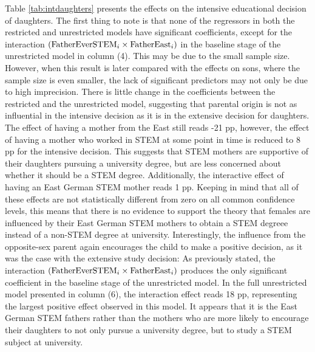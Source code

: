 \documentclass[a4paper, oneside, hyperfootnotes = false]{article}
\begin{document}
{Table \ref{tab:intdaughters} presents the effects on the intensive educational decision of daughters.
The first thing to note is that none of the regressors in both the restricted and unrestricted models have significant coefficients, except for the interaction $(\textnormal{FatherEverSTEM}_{i} \times \textnormal{FatherEast}_{i})$  in the baseline stage of the unrestricted model in column (4).
This may be due to the small sample size.
However, when this result is later compared with the effects on sons, where the sample size is even smaller, the lack of significant predictors may not only be due to high imprecision.
There is little change in the coefficients between the restricted and the unrestricted model, suggesting that parental origin is not as influential in the intensive decision as it is in the extensive decision for daughters.
The effect of having a mother from the East still reads -21 pp, however, the effect of having a mother who worked in STEM at some point in time is reduced to 8 pp for the intensive decision.
This suggests that STEM mothers are supportive of their daughters pursuing a university degree, but are less concerned about whether it should be a STEM degree.
Additionally, the interactive effect of having an East German STEM mother reads 1 pp.
Keeping in mind that all of these effects are not statistically different from zero on all common confidence levels, this means that there is no evidence to support the theory that females are influenced by their East German STEM mothers to obtain a STEM degreee instead of a non-STEM degree at university.
Interestingly, the influence from the opposite-sex parent again encourages the child to make a positive decision, as it was the case with the extensive study decision:
As previously stated, the interaction $(\textnormal{FatherEverSTEM}_{i} \times \textnormal{FatherEast}_{i})$ produces the only significant coefficient in the baseline stage of the unrestricted model.
In the full unrestricted model presented in column (6), the interaction effect reads 18 pp, representing the largest positive effect observed in this model.
It appears that it is the East German STEM fathers rather than the mothers who are more likely to encourage their daughters to not only pursue a university degree, but to study a STEM subject at university.

}
\end{document}
